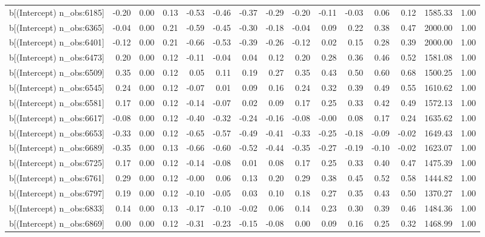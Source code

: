 \begin{table}[ht]
\begin{tabular}{rrrrrrrrrrrrrrr}
  b[(Intercept) n\_obs:6185] & -0.20 & 0.00 & 0.13 & -0.53 & -0.46 & -0.37 & -0.29 & -0.20 & -0.11 & -0.03 & 0.06 & 0.12 & 1585.33 & 1.00 \\ 
  b[(Intercept) n\_obs:6365] & -0.04 & 0.00 & 0.21 & -0.59 & -0.45 & -0.30 & -0.18 & -0.04 & 0.09 & 0.22 & 0.38 & 0.47 & 2000.00 & 1.00 \\ 
  b[(Intercept) n\_obs:6401] & -0.12 & 0.00 & 0.21 & -0.66 & -0.53 & -0.39 & -0.26 & -0.12 & 0.02 & 0.15 & 0.28 & 0.39 & 2000.00 & 1.00 \\ 
  b[(Intercept) n\_obs:6473] & 0.20 & 0.00 & 0.12 & -0.11 & -0.04 & 0.04 & 0.12 & 0.20 & 0.28 & 0.36 & 0.46 & 0.52 & 1581.08 & 1.00 \\ 
  b[(Intercept) n\_obs:6509] & 0.35 & 0.00 & 0.12 & 0.05 & 0.11 & 0.19 & 0.27 & 0.35 & 0.43 & 0.50 & 0.60 & 0.68 & 1500.25 & 1.00 \\ 
  b[(Intercept) n\_obs:6545] & 0.24 & 0.00 & 0.12 & -0.07 & 0.01 & 0.09 & 0.16 & 0.24 & 0.32 & 0.39 & 0.49 & 0.55 & 1610.62 & 1.00 \\ 
  b[(Intercept) n\_obs:6581] & 0.17 & 0.00 & 0.12 & -0.14 & -0.07 & 0.02 & 0.09 & 0.17 & 0.25 & 0.33 & 0.42 & 0.49 & 1572.13 & 1.00 \\ 
  b[(Intercept) n\_obs:6617] & -0.08 & 0.00 & 0.12 & -0.40 & -0.32 & -0.24 & -0.16 & -0.08 & -0.00 & 0.08 & 0.17 & 0.24 & 1635.62 & 1.00 \\ 
  b[(Intercept) n\_obs:6653] & -0.33 & 0.00 & 0.12 & -0.65 & -0.57 & -0.49 & -0.41 & -0.33 & -0.25 & -0.18 & -0.09 & -0.02 & 1649.43 & 1.00 \\ 
  b[(Intercept) n\_obs:6689] & -0.35 & 0.00 & 0.13 & -0.66 & -0.60 & -0.52 & -0.44 & -0.35 & -0.27 & -0.19 & -0.10 & -0.02 & 1623.07 & 1.00 \\ 
  b[(Intercept) n\_obs:6725] & 0.17 & 0.00 & 0.12 & -0.14 & -0.08 & 0.01 & 0.08 & 0.17 & 0.25 & 0.33 & 0.40 & 0.47 & 1475.39 & 1.00 \\ 
  b[(Intercept) n\_obs:6761] & 0.29 & 0.00 & 0.12 & -0.00 & 0.06 & 0.13 & 0.20 & 0.29 & 0.38 & 0.45 & 0.52 & 0.58 & 1444.82 & 1.00 \\ 
  b[(Intercept) n\_obs:6797] & 0.19 & 0.00 & 0.12 & -0.10 & -0.05 & 0.03 & 0.10 & 0.18 & 0.27 & 0.35 & 0.43 & 0.50 & 1370.27 & 1.00 \\ 
  b[(Intercept) n\_obs:6833] & 0.14 & 0.00 & 0.13 & -0.17 & -0.10 & -0.02 & 0.06 & 0.14 & 0.23 & 0.30 & 0.39 & 0.46 & 1484.36 & 1.00 \\ 
  b[(Intercept) n\_obs:6869] & 0.00 & 0.00 & 0.12 & -0.31 & -0.23 & -0.15 & -0.08 & 0.00 & 0.09 & 0.16 & 0.25 & 0.32 & 1468.99 & 1.00 \\ 

\end{tabular}
\end{table}
